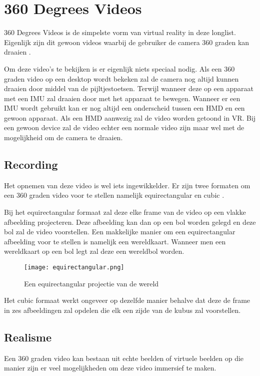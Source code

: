 \section{360 Degrees Videos}
360 Degrees Videos is de simpelste vorm van virtual reality in deze longlist. Eigenlijk zijn dit gewoon videos waarbij de gebruiker de camera 360 graden kan draaien \autocite{Hosseini2016}.

Om deze video's te bekijken is er eigenlijk niets speciaal nodig. Als een 360 graden video op een desktop wordt bekeken zal de camera nog altijd kunnen draaien door middel van de pijltjestoetsen. Terwijl wanneer deze op een apparaat met een IMU zal draaien door met het apparaat te bewegen. Wanneer er een IMU wordt gebruikt kan er nog altijd een onderscheid tussen een HMD en een gewoon apparaat. Als een HMD aanwezig zal de video worden getoond in VR. Bij een gewoon device zal de video echter een normale video zijn maar wel met de mogelijkheid om de camera te draaien.

\subsection{Recording}
Het opnemen van deze video is wel iets ingewikkelder. Er zijn twee formaten om een 360 graden video voor te stellen namelijk equirectangular en cubic \autocite{Lee2010}. 

Bij het equirectangular formaat zal deze elke frame van de video op een vlakke afbeelding projecteren. Deze afbeelding kan dan op een bol worden gelegd en deze bol zal de video voorstellen. Een makkelijke manier om een equirectangular afbeelding voor te stellen is namelijk een wereldkaart. Wanneer men een wereldkaart op een bol legt zal deze een wereldbol worden.
 
\begin{figure}
    \texttt{[image: equirectangular.png]}
    \caption{Een equirectangular projectie van de wereld}
    \label{fig:equirectangularprojection}
\end{figure}

Het cubic formaat werkt ongeveer op dezelfde manier behalve dat deze de frame in zes afbeeldingen zal opdelen die elk een zijde van de kubus zal voorstellen.

\subsection{Realisme}
Een 360 graden video kan bestaan uit echte beelden of virtuele beelden op die manier zijn er veel mogelijkheden om deze video immersief te maken. 

